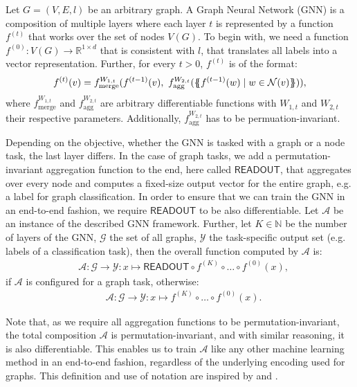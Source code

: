 \begin{definition}\label{def:gnn}
    Let $G = (V, E, l)$ be an arbitrary graph. A Graph Neural Network (GNN) is a composition of multiple layers where each layer $t$ is represented by a function $f^{(t)}$ that works over the set of nodes $V(G)$. To begin with, we need a function $f^{(0)}: V(G) \rightarrow \mathbb{R}^{1 \times d}$ that is consistent with $l$, that translates all labels into a vector representation. Further, for every $t > 0$, $f^{(t)}$ is of the format:
    \begin{align*}
    f^{(t)}(v) = f^{W_{1,t}}_{\text{merge}} (f^{(t-1)}(v), \  f^{W_{2,t}}_{\text{agg}}( \{\!\!\{ f^{(t-1)}(w) \mid w \in \mathcal{N}(v) \}\!\!\} )),
    \end{align*}
    where $f^{W_{1,t}}_{\text{merge}}$ and $f^{W_{2,t}}_{\text{agg}}$ are arbitrary differentiable functions with $W_{1,t}$ and $W_{2,t}$ their respective parameters. Additionally, $f^{W_{2,t}}_{\text{agg}}$ has to be permuation-invariant.

    Depending on the objective, whether the GNN is tasked with a graph or a node task, the last layer differs. In the case of graph tasks, we add a permutation-invariant aggregation function to the end, here called $\textsf{READOUT}$, that aggregates over every node and computes a fixed-size output vector for the entire graph, e.g. a label for graph classification. In order to ensure that we can train the GNN in an end-to-end fashion, we require $\textsf{READOUT}$ to be also differentiable. Let $\mathcal{A}$ be an instance of the described GNN framework. Further, let $K \in \mathbb{N}$ be the number of layers of the GNN, $\mathcal{G}$ the set of all graphs, $\mathcal{Y}$ the task-specific output set (e.g. labels of a classification task), then the overall function computed by $\mathcal{A}$ is:
    \begin{align*}
        &\mathcal{A}: \mathcal{G} \rightarrow \mathcal{Y}: x \mapsto \textsf{READOUT} \circ f^{(K)} \circ \ldots \circ f^{(0)}(x),
    \end{align*}
    if $\mathcal{A}$ is configured for a graph task, otherwise:
    \begin{align*}
        &\mathcal{A}: \mathcal{G} \rightarrow \mathcal{Y}: x \mapsto f^{(K)} \circ \ldots \circ f^{(0)}(x).
    \end{align*}
\end{definition}

Note that, as we require all aggregation functions to be permutation-invariant, the total composition $\mathcal{A}$ is permutation-invariant, and with similar reasoning, it is also differentiable. This enables us to train $\mathcal{A}$ like any other machine learning method in an end-to-end fashion, regardless of the underlying encoding used for graphs. This definition and use of notation are inspired by \cite{Morris2018} and \cite{Xu2018}.

